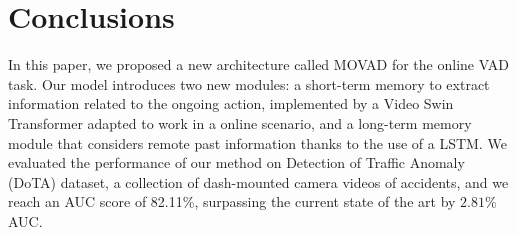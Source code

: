 \section{Conclusions}
\label{sec:conclusions}

In this paper, we proposed a new architecture called MOVAD for the online VAD task.
Our model introduces two new modules: a short-term memory to extract information related to the ongoing action, implemented by a Video Swin Transformer adapted to work in a online scenario, and a long-term memory module that considers remote past information thanks to the use of a LSTM.
We evaluated the performance of our method on Detection of Traffic Anomaly (DoTA) dataset, a collection of dash-mounted camera videos of accidents, and we reach an AUC score of 82.11\%, surpassing the current state of the art by $2.81\%$ AUC.